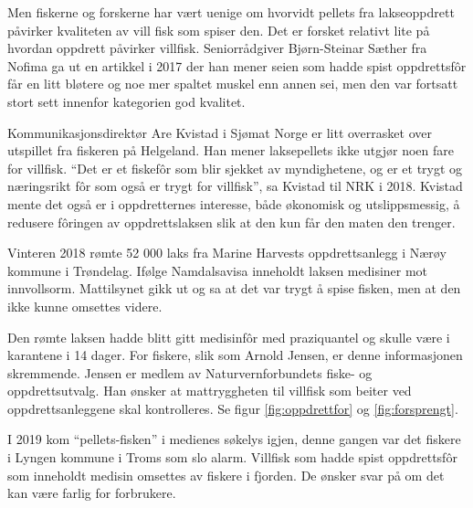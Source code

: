 Men fiskerne og forskerne har vært uenige om hvorvidt pellets fra lakseoppdrett påvirker kvaliteten av vill fisk som spiser den. Det er forsket relativt lite på hvordan oppdrett påvirker villfisk. Seniorrådgiver Bjørn-Steinar Sæther fra Nofima ga ut en artikkel i 2017 der han mener seien som hadde spist oppdrettsfôr får en litt bløtere og noe mer spaltet muskel enn annen sei, men den var fortsatt stort sett innenfor kategorien god kvalitet. \cite{Saether 2017}

Kommunikasjonsdirektør Are Kvistad i Sjømat Norge er litt overrasket over utspillet fra fiskeren på Helgeland. Han mener laksepellets ikke utgjør noen fare for villfisk. ``Det er et fiskefôr som blir sjekket av myndighetene, og er et trygt og næringsrikt fôr som også er trygt for villfisk'', sa Kvistad til NRK i 2018. Kvistad mente det også er i oppdretternes interesse, både økonomisk og utslippsmessig, å redusere fôringen av oppdrettslaksen slik at den kun får den maten den trenger. \cite{Olsen m.fl. 2018}

Vinteren 2018 rømte 52 000 laks fra Marine Harvests oppdrettsanlegg i Nærøy kommune i Trøndelag. Ifølge Namdalsavisa inneholdt laksen medisiner mot innvollsorm. Mattilsynet gikk ut og sa at det var trygt å spise fisken, men at den ikke kunne omsettes videre. \cite{nrk 2018}

Den rømte laksen hadde blitt gitt medisinfôr med praziquantel og skulle være i karantene i 14 dager. For fiskere, slik som Arnold Jensen, er denne informasjonen skremmende. Jensen er medlem av Naturvernforbundets fiske- og oppdrettsutvalg. Han ønsker at mattryggheten til villfisk som beiter ved oppdrettsanleggene skal kontrolleres. Se figur \ref{fig:oppdrettfor} og \ref{fig:forsprengt}. \cite{Christensen 2019}

I 2019 kom ``pellets-fisken'' i medienes søkelys igjen, denne gangen var det fiskere i Lyngen kommune i Troms som slo alarm. Villfisk som hadde spist oppdrettsfôr som inneholdt medisin omsettes av fiskere i fjorden. De ønsker svar på om det kan være farlig for forbrukere. \cite{Trana m.fl. 2019}

